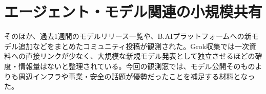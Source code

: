 \section{エージェント・モデル関連の小規模共有}
そのほか、過去1週間のモデルリリース一覧や、B.AIプラットフォームへの新モデル追加などをまとめたコミュニティ投稿が観測された。Grok収集では一次資料への直接リンクが少なく、大規模な新規モデル発表として独立させるほどの確度・情報量はないと整理されている。今回の観測窓では、モデル公開そのものよりも周辺インフラや事業・安全の話題が優勢だったことを補足する材料となった。

